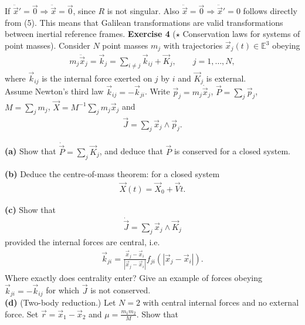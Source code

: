 \documentclass[12pt]{article}
\begin{document}
If $\ddot{\vec{x}}'=\vec{0}\Rightarrow\ddot{\vec{x}}=\vec{0}$, since $R$ is not singular.
Also $\ddot{\vec{x}}=\vec{0}\Rightarrow\ddot{\vec{x}}'=0$ follows directly from (5).  This means that 
Galilean transformations are valid transformations between inertial reference frames.
\newpage
\noindent
\textbf{Exercise 4} ($\star$ Conservation laws for systems of point masses). Consider $N$ point masses
$m_j$ with trajectories $\vec{x}_j(t)\in\mathbb{E}^3$ obeying
\begin{align*}
m_j\ddot{\vec{x}}_j=\vec{k}_j=\sum_{i\neq j}\vec{k}_{ij}+\vec{K}_j,
\qquad j=1,\ldots,N,
\end{align*}
where $\vec{k}_{ij}$ is the internal force exerted on $j$ by $i$ and $\vec{K}_j$ is external.\\
Assume Newton's
third law $\vec{k}_{ij}=-\vec{k}_{ji}$. Write $\vec{p}_j=m_j\dot{\vec{x}}_j$, $\vec{P}=\sum_j\vec{p}_j$,
$M=\sum_jm_j$, $\vec{X}=M^{-1}\sum_jm_j\vec{x}_j$ and
\begin{align*}
\vec{J}=\sum_j\vec{x}_j\wedge\vec{p}_j.
\end{align*}

\textbf{(a)} Show that $\dot{\vec{P}}=\sum_j\vec{K}_j$, and deduce that $\vec{P}$ is conserved for a closed system.

\textbf{(b)} Deduce the centre-of-mass theorem: for a closed system
\begin{align*}
\vec{X}(t)=\vec{X}_0+\vec{V}t.
\end{align*}

\textbf{(c)} Show that
\begin{align*}
\dot{\vec{J}}=\sum_j\vec{x}_j\wedge\vec{K}_j
\end{align*}
\hspace*{1cm}provided the internal forces are central, i.e.
\begin{align*}
\vec{k}_{ji}
=
\frac{\vec{x}_j-\vec{x}_i}{|\vec{x}_j-\vec{x}_i|}
f_{ji}(|\vec{x}_j-\vec{x}_i|).
\end{align*}
\hspace*{1cm}Where exactly does centrality enter? Give an example of forces obeying \\
\hspace*{2cm}$\vec{k}_{ji}=-\vec{k}_{ij}$ for which $\vec{J}$ is not conserved.\\

\textbf{(d)} (Two-body reduction.) Let $N=2$ with central internal forces and no external\\
\hspace*{1cm}force.
Set $\vec{r}=\vec{x}_1-\vec{x}_2$ and $\mu=\frac{m_1m_2}{M}$. Show that
\end{document}
